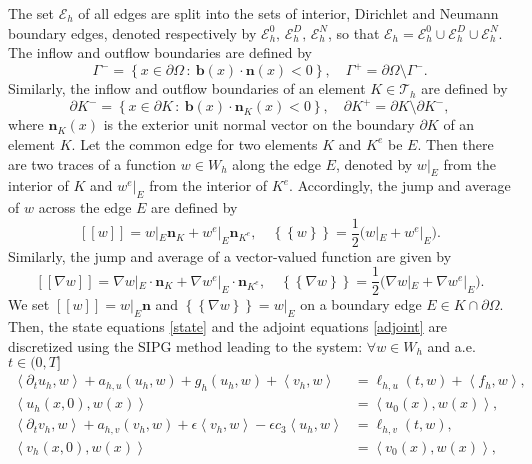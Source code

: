 \documentclass[preprint,12pt]{elsarticle}
\newcommand{\set}[2]{\left\{{#1}\,:~{#2}\right\}}
\newcommand {\average}[1] {\mbox{$\left\{\!\!\left\{ #1 \right\}\!\!\right\}$}}
\newcommand {\jump}[1] {\mbox{$\left[\!\left[ #1 \right]\!\right]$}}
\newcommand {\la}[1] {\left\langle {#1} \right\rangle }
\begin{document}
The set $\mathcal{E}_h$ of all edges are split into the sets of interior, Dirichlet and Neumann boundary edges, denoted respectively by $\mathcal{E}_h^0,\, \mathcal{E}_h^D,\, \mathcal{E}_h^N$, so that $\mathcal{E}_h = \mathcal{E}_h^0 \cup \mathcal{E}_h^D \cup \mathcal{E}_h^N$. The inflow and outflow boundaries are defined by
$$
\Gamma^- = \set{x \in \partial \Omega}{ \bm{b}(x) \cdot \bm{n}(x) < 0}, \quad
\Gamma^+ = \partial \Omega \setminus  \Gamma^-.
$$
Similarly, the inflow and outflow boundaries of an element $K \in \mathcal{T}_h$ are defined by
\begin{equation*}
\partial K^- =\set{x \in \partial K}{\bm{b}(x) \cdot \bm{n}_{K}(x) <0}, \quad \partial K^{+} = \partial K \setminus \partial K^{-},
\end{equation*}
where $\bm{n}_{K}(x)$ is the exterior unit normal vector on the boundary $\partial K$ of an element $K$.
Let the common edge for two elements $K$ and $K^e$ be $E$. Then there are two traces of a function $w\in W_h$ along the edge $E$,  denoted by $w|_E$ from the interior of  $K$ and $w^e|_E$ from the interior of  $K^e$. Accordingly, the jump and average of $w$ across the edge $E$ are defined by
\begin{equation*}
\jump{w} =w|_E\bm{n}_{K} + w^e|_E\bm{n}_{K^e}, \quad
\average{w}=\frac{1}{2}\big( w|_E + w^e|_E \big).
\end{equation*}
Similarly,  the jump and average of a vector-valued function are given by
\begin{equation*}
\jump{\nabla w} =\nabla w|_E \cdot \bm{n}_{K}+\nabla w^e|_E \cdot \bm{n}_{K^e}, \quad
\average{\nabla w}=\frac{1}{2}\big(\nabla w|_E+\nabla w^e|_E \big).
\end{equation*}
We set $\jump{w}=w|_E\bm{n}$ and $ \average{\nabla w}= w|_E$ on a boundary edge $E \in K \cap \partial\Omega$.  Then, the state equations \eqref{state} and the adjoint equations \eqref{adjoint} are discretized using the SIPG method leading to the system: $\forall w \in W_h$ and a.e. $t\in (0,T]$
\begin{equation}\label{sipgstate}
\begin{aligned}
\la{\partial_t u_h, w } + a_{h,u}(u_h,w) + g_h(u_h,w) + \la{v_h,w} &= \ell_{h,u}(t,w) + \la{f_h,w}, \\
\la{u_h(x ,0), w(x)} &= \la{u_0(x ),w(x)}, \\
\la{ \partial_t v_h, w } + a_{h,v}(v_h,w) + \epsilon \la{v_h,w} - \epsilon c_3\la{u_h,w} &= \ell_{h,v}(t,w), \\
\la{v_h(x,0), w(x)}&= \la{v_0(x),w(x)},
\end{aligned}
\end{equation}
\end{document}
